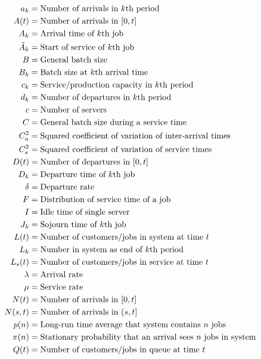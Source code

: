 \documentclass[stochastic-or.tex]{subfiles}
\begin{document}
\begin{align*}
 a_k &= \text{Number of arrivals in~$k$th period} \\
 A(t) &= \text{Number of arrivals in $[0,t]$} \\
 A_k &= \text{Arrival time of~$k$th job} \\
 \tilde A_{k} &= \text{Start of service of~$k$th job} \\
 B &= \text{General batch size} \\
 B_k &= \text{Batch size  at  $k$th arrival time} \\
 c_k &= \text{Service/production capacity in~$k$th period} \\
 d_k &= \text{Number of departures in~$k$th period} \\
 c &= \text{Number of servers} \\
 C &= \text{General batch size during a service time} \\
 C_a^2 &= \text{Squared coefficient of variation of  inter-arrival times} \\
 C_s^2 &= \text{Squared coefficient of variation of  service times} \\
 D(t) &= \text{Number of departures in $[0,t]$} \\
 D_k &= \text{Departure time of~$k$th job} \\
 \delta &= \text{Departure rate} \\
 F &= \text{Distribution of  service time of a job} \\
 I &= \text{Idle time of single server} \\
\J_k &= \text{Sojourn time of~$k$th job} \\
 \L(t) &= \text{Number of customers/jobs in  system at time~$t$} \\
 \L_k &= \text{Number in  system as  end of~$k$th period} \\
 \Ls(t) &= \text{Number of customers/jobs in service at time~$t$} \\
 \lambda &= \text{Arrival rate} \\
 \mu &= \text{Service rate} \\
 N(t) &= \text{Number of arrivals in $[0,t]$} \\
 N(s,t) &= \text{Number of arrivals in $(s,t]$} \\
 p(n) &= \text{Long-run time average that  system contains~$n$ jobs} \\
 \pi(n) &= \text{Stationary probability that an arrival sees~$n$ jobs in  system} \\
 \QQ(t) &= \text{Number of customers/jobs in queue at time~$t$} \\

\end{align*}
\end{document}
